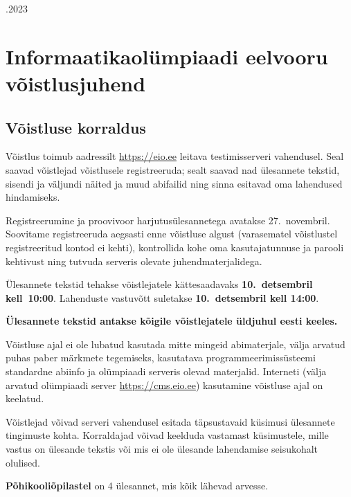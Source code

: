 \documentclass[a4paper,10pt]{article}
\begin{document}
\begin{ol}{\eio}{.2023}{\juh}{}

\section*{Informaatikaolümpiaadi eelvooru võistlusjuhend}

\subsection*{Võistluse korraldus}

\begin{xitem}

\item Võistlus toimub aadressilt \url{https://eio.ee} leitava testimisserveri vahendusel. Seal saavad võistlejad võistlusele registreeruda; sealt saavad nad ülesannete tekstid, sisendi ja väljundi näited ja muud abifailid ning sinna esitavad oma lahendused hindamiseks.

\item Registreerumine ja proovivoor harjutusülesannetega avatakse 27.~{}novembril. Soovitame registreeruda aegsasti enne võistluse algust (varasematel võistlustel registreeritud kontod ei kehti), kontrollida kohe oma kasutajatunnuse ja parooli kehtivust ning tutvuda serveris olevate juhendmaterjalidega.

\item Ülesannete tekstid tehakse võistlejatele kättesaadavaks \textbf{10.~{}detsembril kell~10:00}. Lahenduste vastuvõtt suletakse \textbf{10.~{}detsembril kell 14:00}.

\item \textbf{Ülesannete tekstid antakse kõigile võistlejatele üldjuhul eesti keeles.}

\item Võistluse ajal ei ole lubatud kasutada mitte mingeid abimaterjale, välja arvatud puhas paber märkmete tegemiseks, kasutatava programmeerimissüsteemi standardne abiinfo ja olümpiaadi serveris olevad materjalid. Interneti (välja arvatud olümpiaadi server \url{https://cms.eio.ee}) kasutamine võistluse ajal on keelatud.

\item Võistlejad võivad serveri vahendusel esitada täpsustavaid küsimusi ülesannete tingimuste kohta. Korraldajad võivad keelduda vastamast küsimustele, mille vastus on ülesande tekstis või mis ei ole ülesande lahendamise seisukohalt olulised.

\item \textbf{Põhikooliõpilastel} on 4 ülesannet, mis kõik lähevad arvesse.


\end{xitem}
\end{ol}
\end{document}
